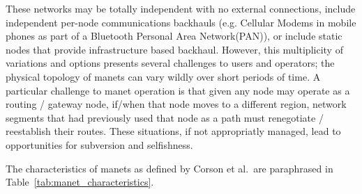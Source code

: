 These networks may be totally independent with no external connections, include independent per-node communications backhauls (e.g.
Cellular Modems in mobile phones as part of a Bluetooth Personal Area Network(PAN)), or include static nodes that provide infrastructure based backhaul.
However, this multiplicity of variations and options presents several challenges to users and operators; the physical topology of \glspl{manet} can vary wildly over short periods of time.
A particular challenge to \gls{manet} operation is that given any node may operate as a routing / gateway node, if/when that node moves to a different region, network segments that had previously used that node as a path must renegotiate / reestablish their routes.
These situations, if not appropriatly managed, lead to opportunities for subversion and selfishness.

The characteristics of \gls{manet}s as defined by Corson et al.\ are paraphrased in Table~\ref{tab:manet_characteristics}.

